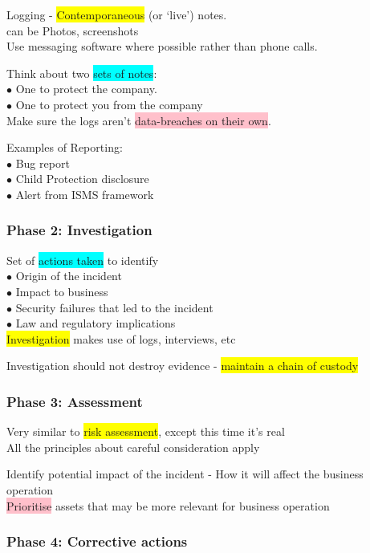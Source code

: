 \documentclass[tikz,border=10pt]{project_plan}
\newcommand{\bulletPoint}{\hspace{-3.1pt}$\bullet$ \hspace{5pt}}
\begin{document}
Logging - \colorbox{yellow}{Contemporaneous} (or ‘live’) notes. \\
can be Photos, screenshots \\
Use messaging software where possible rather than phone calls.

Think about two \colorbox{cyan}{sets of notes}: \\
\bulletPoint One to protect the company.\\
\bulletPoint One to protect you from the company\\
Make sure the logs aren’t \colorbox{pink}{data-breaches on their own}.

Examples of Reporting:\\
\bulletPoint Bug report \\
\bulletPoint Child Protection disclosure \\
\bulletPoint Alert from ISMS framework

\subsubsection{Phase 2: Investigation}

Set of \colorbox{cyan}{actions taken} to identify\\
\bulletPoint Origin of the incident\\
\bulletPoint Impact to business\\
\bulletPoint Security failures that led to the incident\\
\bulletPoint Law and regulatory implications\\
\colorbox{yellow}{Investigation} makes use of logs, interviews, etc

Investigation should not destroy evidence - \colorbox{yellow}{maintain a chain of custody}


\subsubsection{Phase 3: Assessment}

Very similar to \colorbox{yellow}{risk assessment}, except this time it’s real\\
All the principles about careful consideration apply

Identify potential impact of the incident - How it will affect the business operation\\
\colorbox{pink}{Prioritise} assets that may be more relevant for business operation


\subsubsection{Phase 4: Corrective actions}
\end{document}

